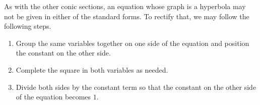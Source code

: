  \ifvc 
As with the other conic sections, an equation whose graph is a hyperbola may not be given in either of the standard forms. To rectify that, we may follow the following steps.


 \begin{enumerate}

\item  Group the same variables together on one side of the equation and position the constant on the other side.

\item  Complete the square in both variables as needed.

\item  Divide both sides by the constant term so that the constant on the other side of the equation becomes $1$.

\end{enumerate}
\fi


